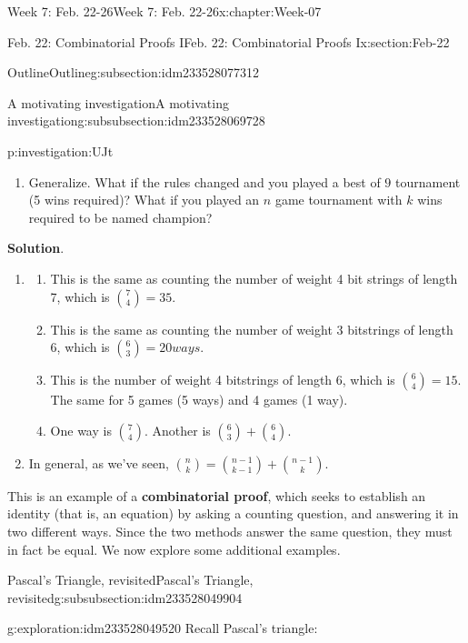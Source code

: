 \documentclass[oneside,10pt,]{book}
\newcommand{\blocktitlefont}{\relax}
\newcommand{\terminology}[1]{\textbf{#1}}
\numberwithin{equation}{section}
\begin{document}
\begin{chapterptx}{Week 7: Feb. 22-26}{}{Week 7: Feb. 22-26}{}{}{x:chapter:Week-07}
\begin{sectionptx}{Feb. 22: Combinatorial Proofs I}{}{Feb. 22: Combinatorial Proofs I}{}{}{x:section:Feb-22}
\begin{subsectionptx}{Outline}{}{Outline}{}{}{g:subsection:idm233528077312}
\begin{subsubsectionptx}{A motivating investigation}{}{A motivating investigation}{}{}{g:subsubsection:idm233528069728}
\begin{investigation}{}{p:investigation:UJt}
\begin{enumerate}
\begin{enumerate}
\end{enumerate}
%
\item{}Generalize. What if the rules changed and you played a best of \(9\) tournament (5 wins required)? What if you played an \(n\) game tournament with \(k\) wins required to be named champion?%
\end{enumerate}
%
\par\smallskip%
\noindent\textbf{\blocktitlefont Solution}.\hypertarget{g:solution:idm233528055760}{}\quad{}%
\begin{enumerate}
\item{}%
\begin{enumerate}
\item{}This is the same as counting the number of weight 4 bit strings of length 7, which is \(\binom{7}{4} = 35\).%
\item{}This is the same as counting the number of weight 3 bitstrings of length 6, which is \(\binom{6}{3} = 20 ways\).%
\item{}This is the number of weight 4 bitstrings of length 6, which is \(\binom{6}{4} = 15\). The same for 5 games (5 ways) and 4 games (1 way).%
\item{}One way is \(\binom{7}{4}\). Another is \(\binom{6}{3} + \binom{6}{4}\).%
\end{enumerate}
%
\item{}In general, as we've seen, \(\binom{n}{k} = \binom{n-1}{k-1}+\binom{n-1}{k}\).%
\end{enumerate}
\end{investigation}%
This is an example of a \terminology{combinatorial proof}, which seeks to establish an identity (that is, an equation) by asking a counting question, and answering it in two different ways. Since the two methods answer the same question, they must in fact be equal. We now explore some additional examples.%
\end{subsubsectionptx}
%
%
\typeout{************************************************}
\typeout{************************************************}
%
\begin{subsubsectionptx}{Pascal's Triangle, revisited}{}{Pascal's Triangle, revisited}{}{}{g:subsubsection:idm233528049904}
\begin{exploration}{}{g:exploration:idm233528049520}%
Recall Pascal's triangle:%
\begin{image}{0}{1}{0}%

\end{image}
\end{exploration}
\end{subsubsectionptx}
\end{subsectionptx}
\end{sectionptx}
\end{chapterptx}
\end{document}
